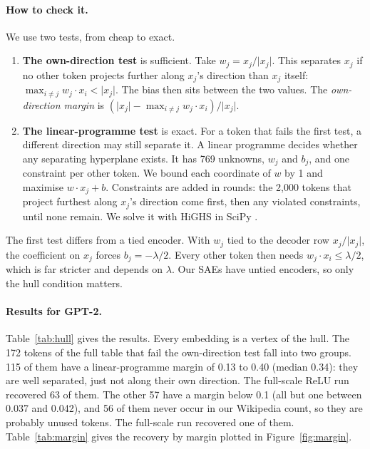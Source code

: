 \documentclass[11pt]{article}
\newcommand{\norm}[1]{\lvert #1\rvert}
\begin{document}
\paragraph{How to check it.} We use two tests, from cheap to exact.
\begin{enumerate}[leftmargin=*]
\item \textbf{The own-direction test} is sufficient. Take $w_j = x_j/\norm{x_j}$. This separates $x_j$ if no other token projects further along $x_j$'s direction than $x_j$ itself: $\max_{i \ne j} w_j \cdot x_i < \norm{x_j}$. The bias then sits between the two values. The \emph{own-direction margin} is $(\norm{x_j} - \max_{i \ne j} w_j\cdot x_i)/\norm{x_j}$.
\item \textbf{The linear-programme test} is exact. For a token that fails the first test, a different direction may still separate it. A linear programme decides whether any separating hyperplane exists. It has 769 unknowns, $w_j$ and $b_j$, and one constraint per other token. We bound each coordinate of $w$ by 1 and maximise $w \cdot x_j + b$. Constraints are added in rounds: the 2,000 tokens that project furthest along $x_j$'s direction come first, then any violated constraints, until none remain. We solve it with HiGHS \cite{huangfu2018highs} in SciPy \cite{virtanen2020scipy}.
\end{enumerate}

The first test differs from a tied encoder. With $w_j$ tied to the decoder row $x_j/\norm{x_j}$, the coefficient on $x_j$ forces $b_j = -\lambda/2$. Every other token then needs $w_j \cdot x_i \le \lambda/2$, which is far stricter and depends on $\lambda$. Our SAEs have untied encoders, so only the hull condition matters.

\paragraph{Results for GPT-2.} Table~\ref{tab:hull} gives the results. Every embedding is a vertex of the hull. The 172 tokens of the full table that fail the own-direction test fall into two groups. 115 of them have a linear-programme margin of 0.13 to 0.40 (median 0.34): they are well separated, just not along their own direction. The full-scale ReLU run recovered 63 of them. The other 57 have a margin below 0.1 (all but one between 0.037 and 0.042), and 56 of them never occur in our Wikipedia count, so they are probably unused tokens. The full-scale run recovered one of them. Table~\ref{tab:margin} gives the recovery by margin plotted in Figure~\ref{fig:margin}.
\end{document}
